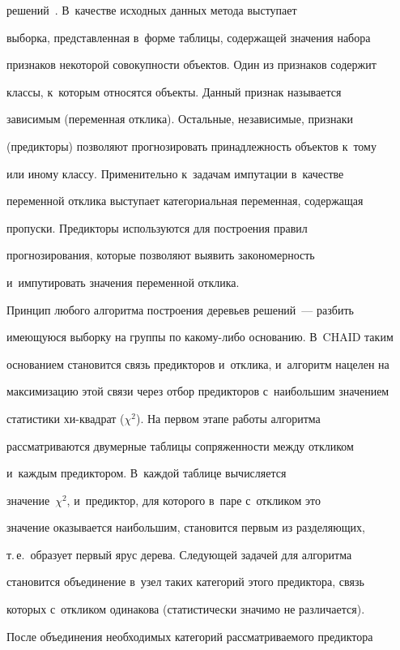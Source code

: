 решений~\cite{8-ad}. В~качестве исходных данных метода выступает 


выборка, представленная в~форме таб\-ли\-цы, содержащей значения набора 


признаков некоторой совокупности объектов. Один из признаков содержит 


классы, к~которым относятся объекты. Данный признак называется 


зависимым (переменная отклика). Остальные, независимые, признаки 


(предикторы) позволяют прогнозировать принадлежность объектов к~тому 


или иному классу. Применительно к~задачам импутации в~качестве 


переменной отклика выступает категориальная переменная, содержащая 


пропуски. Предикторы используются для построения правил 


прогнозирования, которые позволяют выявить закономерность 


и~импутировать значения переменной отклика.


  


  Принцип любого алгоритма построения деревьев решений~--- разбить 


имеющуюся выборку на группы по какому-либо основанию. В~CHAID таким 


основанием становится связь предикторов и~отклика, и~алгоритм нацелен на 


максимизацию этой связи через отбор предикторов с~наибольшим значением 


статистики хи-квад\-рат ($\chi^2$). На первом этапе работы алгоритма 


рассматриваются двумерные таблицы сопряженности между откликом 


и~каждым предиктором. В~каждой таб\-ли\-це вычисляется 


значение~$\chi^2$, и~предиктор, для которого в~паре с~откликом это 


значение оказывается наибольшим, становится первым из разделяющих, 


т.\,е.\ образует первый ярус дерева. Следующей задачей для алгоритма 


становится объединение в~узел таких категорий этого предиктора, связь 


которых с~откликом одинакова (статистически значимо не различается). 


После объединения необходимых категорий рассматриваемого предиктора 


